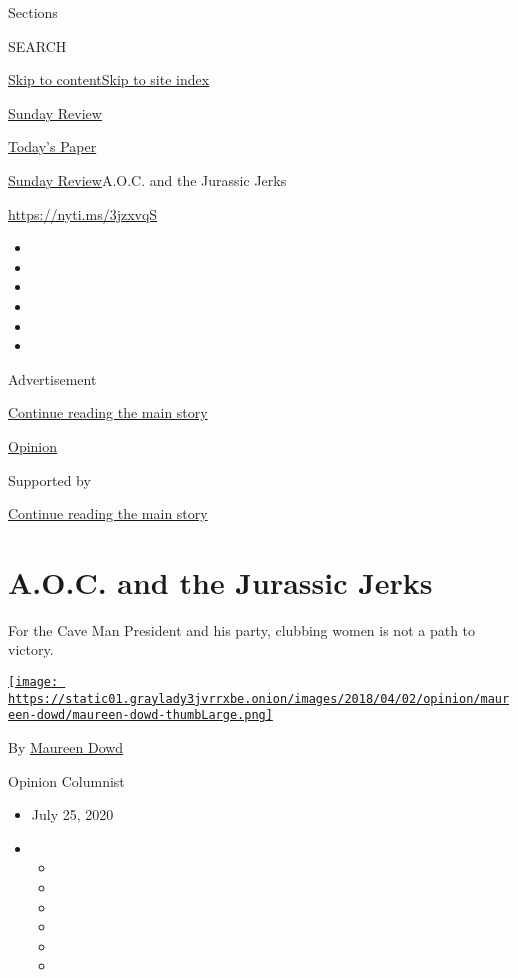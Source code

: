 Sections

SEARCH

\protect\hyperlink{site-content}{Skip to
content}\protect\hyperlink{site-index}{Skip to site index}

\href{https://www.nytimes3xbfgragh.onion/section/opinion/sunday}{Sunday
Review}

\href{https://myaccount.nytimes3xbfgragh.onion/auth/login?response_type=cookie\&client_id=vi}{}

\href{https://www.nytimes3xbfgragh.onion/section/todayspaper}{Today's
Paper}

\href{/section/opinion/sunday}{Sunday Review}\textbar{}A.O.C. and the
Jurassic Jerks

\href{https://nyti.ms/3jzxvqS}{https://nyti.ms/3jzxvqS}

\begin{itemize}
\item
\item
\item
\item
\item
\item
\end{itemize}

Advertisement

\protect\hyperlink{after-top}{Continue reading the main story}

\href{/section/opinion}{Opinion}

Supported by

\protect\hyperlink{after-sponsor}{Continue reading the main story}

\hypertarget{aoc-and-the-jurassic-jerks}{%
\section{A.O.C. and the Jurassic
Jerks}\label{aoc-and-the-jurassic-jerks}}

For the Cave Man President and his party, clubbing women is not a path
to victory.

\href{https://www.nytimes3xbfgragh.onion/by/maureen-dowd}{\texttt{[image: https://static01.graylady3jvrrxbe.onion/images/2018/04/02/opinion/maureen-dowd/maureen-dowd-thumbLarge.png]}}

By \href{https://www.nytimes3xbfgragh.onion/by/maureen-dowd}{Maureen
Dowd}

Opinion Columnist

\begin{itemize}
\item
  July 25, 2020
\item
  \begin{itemize}
  \item
  \item
  \item
  \item
  \item
  \item
  \end{itemize}
\end{itemize}

